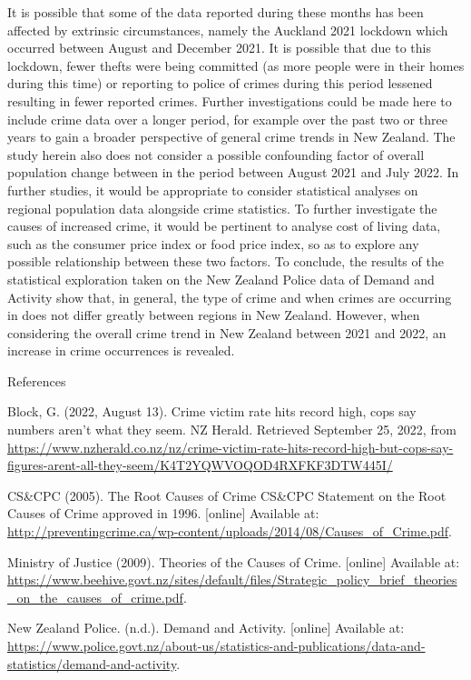 \documentclass[
  10pt,
]{article}
\begin{document}
It is possible that some of the data reported during these months has
been affected by extrinsic circumstances, namely the Auckland 2021
lockdown which occurred between August and December 2021. It is possible
that due to this lockdown, fewer thefts were being committed (as more
people were in their homes during this time) or reporting to police of
crimes during this period lessened resulting in fewer reported crimes.
Further investigations could be made here to include crime data over a
longer period, for example over the past two or three years to gain a
broader perspective of general crime trends in New Zealand. The study
herein also does not consider a possible confounding factor of overall
population change between in the period between August 2021 and July
2022. In further studies, it would be appropriate to consider
statistical analyses on regional population data alongside crime
statistics. To further investigate the causes of increased crime, it
would be pertinent to analyse cost of living data, such as the consumer
price index or food price index, so as to explore any possible
relationship between these two factors. To conclude, the results of the
statistical exploration taken on the New Zealand Police data of Demand
and Activity show that, in general, the type of crime and when crimes
are occurring in does not differ greatly between regions in New Zealand.
However, when considering the overall crime trend in New Zealand between
2021 and 2022, an increase in crime occurrences is revealed.

References

Block, G. (2022, August 13). Crime victim rate hits record high, cops
say numbers aren't what they seem. NZ Herald. Retrieved September 25,
2022, from
\url{https://www.nzherald.co.nz/nz/crime-victim-rate-hits-record-high-but-cops-say-figures-arent-all-they-seem/K4T2YQWVOQOD4RXFKF3DTW445I/}

CS\&CPC (2005). The Root Causes of Crime CS\&CPC Statement on the Root
Causes of Crime approved in 1996. {[}online{]} Available at:
\url{http://preventingcrime.ca/wp-content/uploads/2014/08/Causes_of_Crime.pdf}.

Ministry of Justice (2009). Theories of the Causes of Crime.
{[}online{]} Available at:
\url{https://www.beehive.govt.nz/sites/default/files/Strategic_policy_brief_theories_on_the_causes_of_crime.pdf}.

New Zealand Police. (n.d.). Demand and Activity. {[}online{]} Available
at:
\url{https://www.police.govt.nz/about-us/statistics-and-publications/data-and-statistics/demand-and-activity}.
\end{document}
